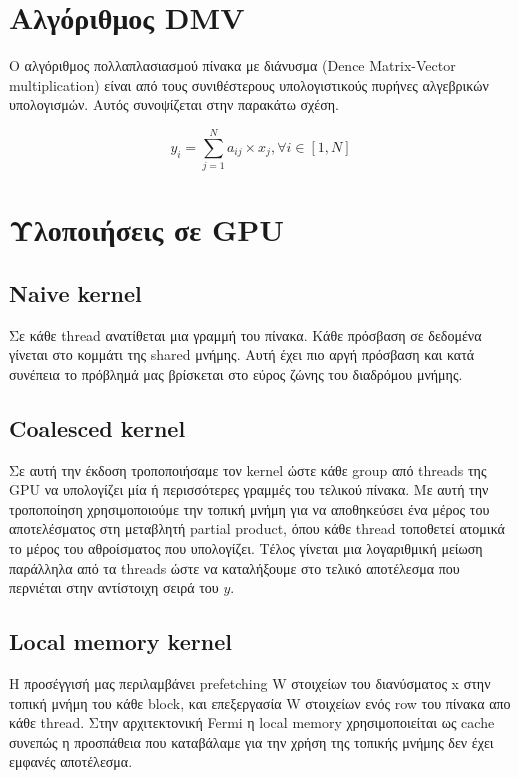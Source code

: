 







\setcounter{section}{1}

\section{Αλγόριθμος DMV}
Ο αλγόριθμος πολλαπλασιασμού πίνακα με διάνυσμα (Dence Matrix-Vector
multiplication) είναι από τους συνιθέστερους υπολογιστικούς πυρήνες αλγεβρικών
υπολογισμών. Αυτός συνοψίζεται στην παρακάτω σχέση.

\[
    y_i = \sum_{j=1}^{N}a_{ij}\times x_{j}, \forall i \in [1,N]
\]



\section{Υλοποιήσεις σε GPU}

\subsection{Naive kernel}
Σε κάθε thread ανατίθεται μια γραμμή του πίνακα. Κάθε πρόσβαση σε δεδομένα
γίνεται στο κομμάτι της shared μνήμης. Αυτή έχει πιο αργή πρόσβαση και κατά
συνέπεια το πρόβλημά μας βρίσκεται στο εύρος ζώνης του διαδρόμου μνήμης.

\subsection{Coalesced kernel}
Σε αυτή την έκδοση τροποποιήσαμε τον kernel ώστε κάθε group από threads της
GPU να υπολογίζει μία ή περισσότερες γραμμές του τελικού πίνακα. Με αυτή την
τροποποίηση χρησιμοποιούμε την τοπική μνήμη για να αποθηκεύσει ένα μέρος του
αποτελέσματος στη μεταβλητή partial product, όπου κάθε thread τοποθετεί
ατομικά το μέρος του αθροίσματος που υπολογίζει. Τέλος γίνεται μια λογαριθμική
μείωση παράλληλα από τα threads ώστε να καταλήξουμε στο τελικό αποτέλεσμα που
περνιέται στην αντίστοιχη σειρά του $y$.


\subsection{Local memory kernel}
Η προσέγγισή μας περιλαμβάνει prefetching W στοιχείων του διανύσματος x στην
τοπική μνήμη του κάθε block, και επεξεργασία W στοιχείων ενός row του πίνακα
απο κάθε thread. Στην αρχιτεκτονική Fermi η local memory χρησιμοποιείται ως
cache συνεπώς η προσπάθεια που καταβάλαμε για την χρήση της τοπικής μνήμης δεν
έχει εμφανές αποτέλεσμα.

